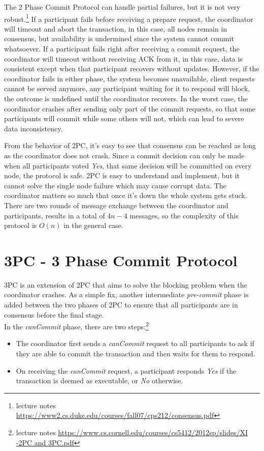 \documentclass[11pt]{article}
\begin{document}
    The 2 Phase Commit Protocol can handle partial failures, but it is not very robust.\footnote{\label{}lecture notes \url{https://www2.cs.duke.edu/courses/fall07/cps212/consensus.pdf}} If a participant fails before receiving a prepare request, the coordinator will timeout and abort the transaction, in this case, all nodes remain in consensus, but availability is undermined since the system cannot commit whatsoever. If a participant fails right after receiving a commit request, the coordinator will timeout without receiving \small{ACK} \normalsize from it, in this case, data is consistent except when that participant recovers without updates. However, if the coordinator fails in either phase, the system becomes unavailable, client requests cannot be served anymore, any participant waiting for it to respond will block, the outcome is undefined until the coordinator recovers. In the worst case, the coordinator crashes after sending only part of the commit requests, so that some participants will commit while some others will not, which can lead to severe data inconsistency.

    From the behavior of \small{2PC}\normalsize, it's easy to see that consensus can be reached as long as the coordinator does not crash. Since a commit decision can only be made when all participants voted \textit{Yes}, that same decision will be committed on every node, the protocol is safe. \small{2PC} \normalsize is easy to understand and implement, but it cannot solve the single node failure which may cause corrupt data. The coordinator matters so much that once it's down the whole system gets stuck. There are two rounds of message exchange between the coordinator and participants, results in a total of $4n - 4$ messages, so the complexity of this protocol is $O(n)$ in the general case.

  \section{3PC - 3 Phase Commit Protocol}
    \small{3PC} \normalsize is an extension of \small{2PC} \normalsize that aims to solve the blocking problem when the coordinator crashes. As a simple fix, another intermediate \textit{pre-commit} phase is added between the two phases of \small{2PC} \normalsize to ensure that all participants are in consensus before the final stage.\autocite{i3pc}\\

    In the \textit{canCommit} phase, there are two steps:\footnote{\label{}lecture notes \url{https://www.cs.cornell.edu/courses/cs5412/2012sp/slides/XI -2PC and 3PC.pdf}}
    \begin{itemize}
      \item The coordinator first sends a \textit{canCommit} request to all participants to ask if they are able to commit the transaction and then waits for them to respond.
      \item On receiving the \textit{canCommit} request, a participant responds \textit{Yes} if the transaction is deemed as executable, or \textit{No} otherwise.
    \end{itemize}
\end{document}
